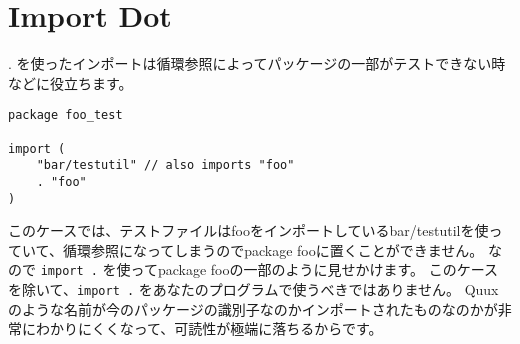 \section{Import Dot}

. を使ったインポートは循環参照によってパッケージの一部がテストできない時などに役立ちます。

\begin{lstlisting}[]
package foo_test

import (
    "bar/testutil" // also imports "foo"
    . "foo"
)
\end{lstlisting}

このケースでは、テストファイルはfooをインポートしているbar/testutilを使っていて、循環参照になってしまうのでpackage fooに置くことができません。 なので \texttt{import .} を使ってpackage fooの一部のように見せかけます。 このケースを除いて、\texttt{import .} をあなたのプログラムで使うべきではありません。 Quuxのような名前が今のパッケージの識別子なのかインポートされたものなのかが非常にわかりにくくなって、可読性が極端に落ちるからです。
